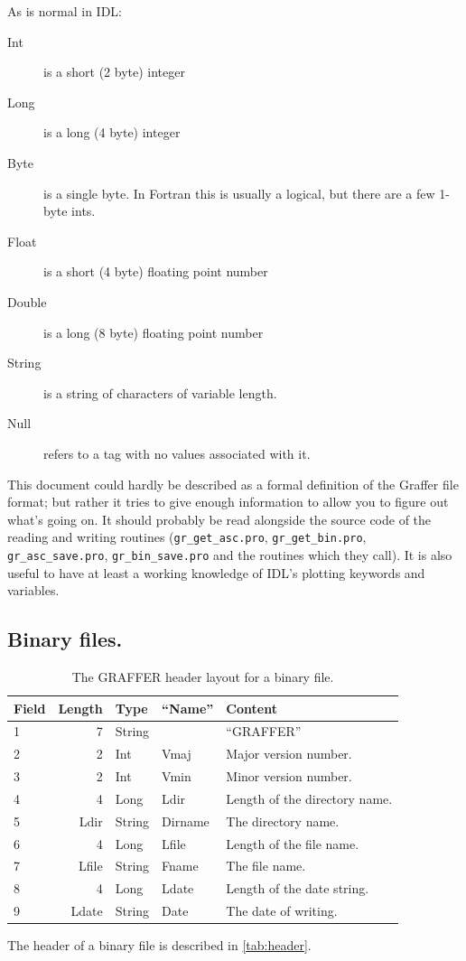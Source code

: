 \documentclass[english]{article}
\begin{document}
As is normal in IDL:

\begin{description}
\item [Int] is a short (2 byte) integer
\item [Long] is a long (4 byte) integer
\item [Byte] is a single byte. In Fortran this is usually a logical,
  but there are a few 1-byte ints.
\item [Float] is a short (4 byte) floating point number
\item [Double] is a long (8 byte) floating point number
\item [String] is a string of characters of variable length.
\item [Null] refers to a tag with no values associated with it.
\end{description}

This document could hardly be described as a formal definition of
the Graffer file format; but rather it tries to give enough information
to allow you to figure out what's going on. It should probably be
read alongside the source code of the reading and writing routines
(\texttt{gr\_get\_asc.pro}, \texttt{gr\_get\_bin.pro},
\texttt{gr\_asc\_save.pro}, 
\texttt{gr\_bin\_save.pro} and the routines which they call). It is
also useful to have at least a working knowledge of IDL's plotting
keywords and variables.


\subsection{Binary files.}
\begin{table}
  \centering
  \begin{tabular}{lrlll}
    \hline
    Field & Length & Type & ``Name'' & Content \\
    \hline
    1 & 7 & String & & ``GRAFFER''\\
    2 & 2 & Int & Vmaj & Major version number. \\
    3 & 2 & Int & Vmin & Minor version number. \\
    4 & 4 & Long & Ldir & Length of the directory name. \\
    5 & Ldir & String & Dirname & The directory name. \\
    6 & 4 & Long & Lfile & Length of the file name. \\
    7 & Lfile & String & Fname & The file name.\\
    8 & 4 & Long & Ldate & Length of the date string.\\
    9 & Ldate & String & Date & The date of writing.\\
    \hline
  \end{tabular}
  \caption{The GRAFFER header layout for a binary file.}
  \label{tab:header}
\end{table}
The header of a binary file is described in \autoref{tab:header}.
\end{document}
